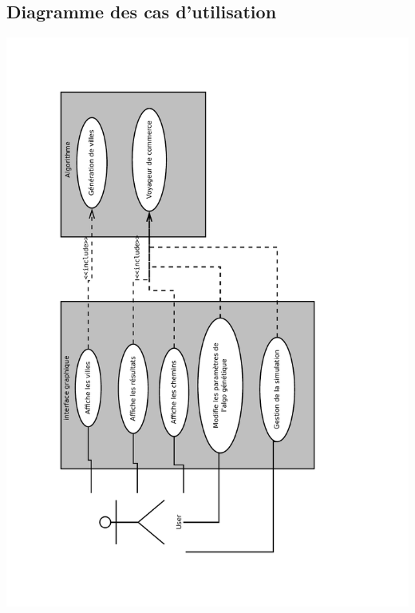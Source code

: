 \documentclass{report}
\begin{document}
\subsection{Diagramme des cas d'utilisation}
	\includegraphics[scale=0.6, angle=270]{../UseCase.pdf}
\end{document}
